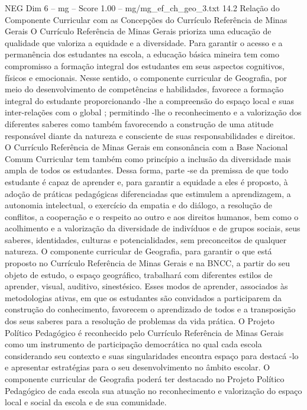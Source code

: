 \begin{textsample}{NEG Dim 6 – mg – Score 1.00 – mg/mg\_ef\_ch\_geo\_3.txt}  \label{ex:f6_neg_050}
14.2 Relação do Componente Curricular com as Concepções do Currículo Referência de Minas Gerais O Currículo Referência de Minas Gerais prioriza uma educação de qualidade que valoriza a equidade e a diversidade.
Para garantir o acesso e a permanência dos estudantes na escola, a educação básica mineira tem como compromisso a formação integral dos estudantes em seus aspectos cognitivos, físicos e emocionais.
Nesse sentido, o componente curricular de Geografia, por meio do desenvolvimento de competências e habilidades, favorece a formação integral do estudante proporcionando -lhe a compreensão do espaço local e suas inter-relações com o global ; permitindo -lhe o reconhecimento e a valorização dos diferentes saberes como também favorecendo a construção de uma atitude responsável diante da natureza e consciente de suas responsabilidades e direitos.
O Currículo Referência de Minas Gerais em consonância com a Base Nacional Comum Curricular tem também como princípio a inclusão da diversidade mais ampla de todos os estudantes.
Dessa forma, parte -se da premissa de que todo estudante é capaz de aprender e, para garantir a equidade a eles é proposto, à adoção de práticas pedagógicas diferenciadas que estimulem a aprendizagem, a autonomia intelectual, o exercício da empatia e do diálogo, a resolução de conflitos, a cooperação e o respeito ao outro e aos direitos humanos, bem como o acolhimento e a valorização da diversidade de indivíduos e de grupos sociais, seus saberes, identidades, culturas e potencialidades, sem preconceitos de qualquer natureza.
O componente curricular de Geografia, para garantir o que está proposto no Currículo Referência de Minas Gerais e na BNCC, a partir do seu objeto de estudo, o espaço geográfico, trabalhará com diferentes estilos de aprender, visual, auditivo, sinestésico.
Esses modos de aprender, associados às metodologias ativas, em que os estudantes são convidados a participarem da construção do conhecimento, favorecem o aprendizado de todos e a transposição dos seus saberes para a resolução de problemas da vida prática.
O Projeto Político Pedagógico é reconhecido pelo Currículo Referência de Minas Gerais como um instrumento de participação democrática no qual cada escola considerando seu contexto e suas singularidades encontra espaço para destacá -lo e apresentar estratégias para o seu desenvolvimento no âmbito escolar.
O componente curricular de Geografia poderá ter destacado no Projeto Político Pedagógico de cada escola sua atuação no reconhecimento e valorização do espaço local e social da escola e de sua comunidade.

\end{textsample}
